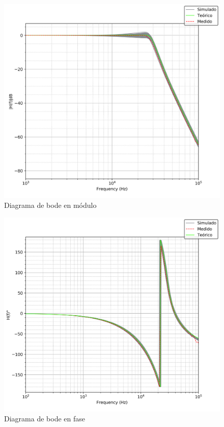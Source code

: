 \begin{figure}[H]
	\centering
	\includegraphics[scale=0.7]{../EJ1/Recursos/legendre_bode_modulo.png}
	\caption{Diagrama de bode en m\'odulo}
	\label{fig:legendre_bode_modulo}
\end{figure}

\begin{figure}[H]
	\centering
	\includegraphics[scale=0.7]{../EJ1/Recursos/legendre_bode_fase.png}
	\caption{Diagrama de bode en fase}
	\label{fig:legendre_bode_fase}
\end{figure}

